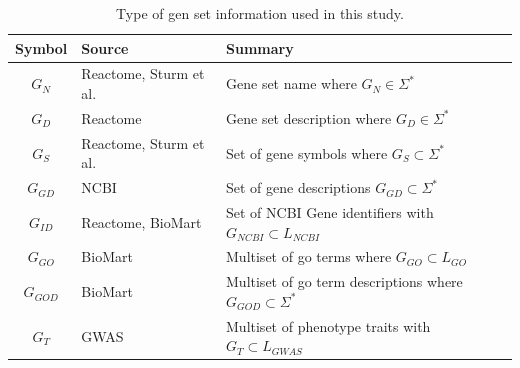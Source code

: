 \documentclass{thesisclass}
\begin{document}
\begin{table}[!h]
	\begin{tabularx}{\linewidth}{c|l|X}
		Symbol & Source & Summary \\
		\hline
		$G_N$ & Reactome, Sturm et al. & Gene set name where $G_N \in  \Sigma^*$  \\
		$G_{D}$ & Reactome & Gene set description where $G_{D} \in \Sigma^*$ \\
		$G_S$ & Reactome, Sturm et al. & Set of gene symbols where $G_S \subset \Sigma^*$ \\
		$G_{GD}$& NCBI & Set of gene descriptions $G_{GD} \subset \Sigma^*$\\
		$G_{ID}$ & Reactome, BioMart & Set of NCBI Gene identifiers with $G_{NCBI} \subset L_{NCBI}$ \\
		$G_{GO}$& BioMart & Multiset of \acrshort{go} terms where $G_{GO} \subset L_{GO}$\\
		$G_{GOD}$& BioMart & Multiset of \acrshort{go} term descriptions where $G_{GOD} \subset \Sigma^*$\\
		$G_{T}$ & GWAS & Multiset of phenotype traits with $G_{T} \subset L_{GWAS}$\\
	\end{tabularx}
	\caption{Type of gen set information used in this study.}
	\label{fig:gs_info}
\end{table}
\end{document}
